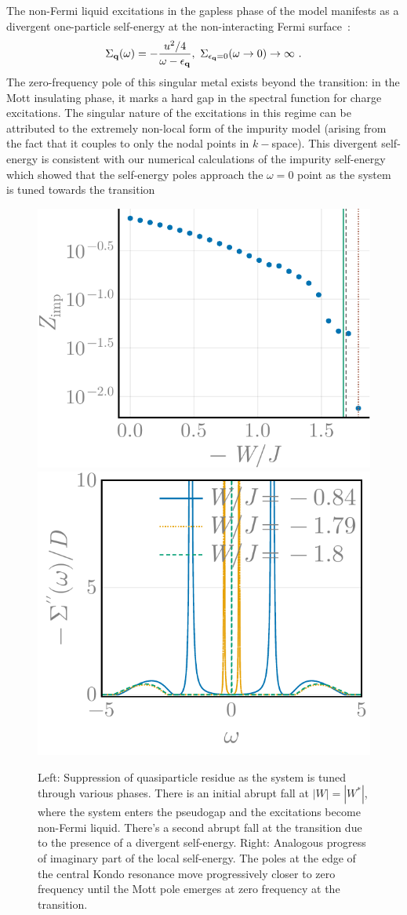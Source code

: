 \documentclass[%
 reprint,
superscriptaddress,
groupedaddress,
 amsmath,amssymb,
 aps,
prl
]{revtex4-2}
\begin{document}
The non-Fermi liquid 
excitations in the %
gapless phase of the model 
manifests as
a divergent one-particle self-energy at the non-interacting Fermi surface~\cite{Phillips2020}:
\begin{equation}\begin{aligned}
	\Sigma_{{\bf q}}(\omega) = -\frac{u^2/4}{\omega - \epsilon_{\bf q}}, ~\Sigma_{\epsilon_{\bf q}=0}(\omega \to 0)  \to \infty~.
\end{aligned}\end{equation}
The zero-frequency pole of this singular metal %
exists beyond the transition: in the Mott insulating phase, it marks a hard gap in the spectral function for charge excitations. The singular nature of the excitations in this regime can be attributed to the extremely non-local form of the impurity model (arising from the fact that it couples to only the nodal points in $k-$space). This divergent self-energy is consistent with our numerical calculations of the impurity self-energy which showed that the self-energy poles approach the $\omega=0$ point as the system is tuned towards the transition

\begin{figure}
    \centering
    \includegraphics[width=0.49\linewidth]{localQPResidue.pdf}
    \includegraphics[width=0.49\linewidth]{sigmaImag_49-1000.pdf}
    \caption{Left: Suppression of quasiparticle residue as the system is tuned through various phases. There is an initial abrupt fall at $|W| = |W^*|$, where the system enters the pseudogap and the excitations become non-Fermi liquid. There's a second abrupt fall at the transition due to the presence of a divergent self-energy. Right: Analogous progress of imaginary part of the local self-energy. The poles at the edge of the central Kondo resonance move progressively closer to zero frequency until the Mott pole emerges at zero frequency at the transition.}
    \label{channelDecoupling}
\end{figure}
\end{document}
